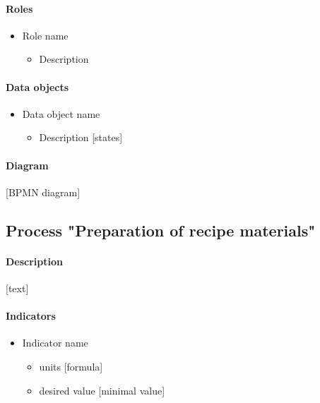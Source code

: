 \documentclass[11pt,a4paper]{article}
\begin{document}
\paragraph{Roles}

\begin{itemize}
    \item Role name
    \begin{itemize}
        \item Description
    \end{itemize}
\end{itemize}

\paragraph{Data objects}

\begin{itemize}
    \item Data object name
    \begin{itemize}
        \item Description [states]
    \end{itemize}
\end{itemize}

\paragraph{Diagram}

[BPMN diagram]

\subsection{Process "Preparation of recipe materials"}

\paragraph{Description}

[text]

\paragraph{Indicators}

\begin{itemize}
    \item Indicator name
    \begin{itemize}
        \item units [formula]
        \item desired value [minimal value]
    \end{itemize}
\end{itemize}
\end{document}
